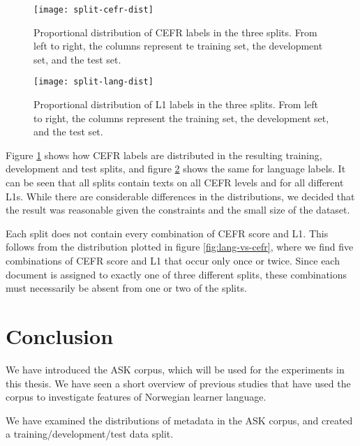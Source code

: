 \begin{figure}
  \centering
  \texttt{[image: split-cefr-dist]}
  \caption[Proportional distribution of CEFR labels in the three splits.]{
    Proportional distribution of CEFR labels in the three splits. From left
    to right, the columns represent te training set, the development set, and
    the test set.
  }
  \label{fig:split-cefr-dist}
\end{figure}

\begin{figure}
  \centering
  \texttt{[image: split-lang-dist]}
  \caption[Proportional distribution of L1 labels in the three splits.]{
    Proportional distribution of \ac{L1} labels in the three splits. From
    left to right, the columns represent the training set, the development
    set, and the test set.
  }
  \label{fig:split-lang-dist}
\end{figure}

Figure \ref{fig:split-cefr-dist} shows how CEFR labels are distributed in the
resulting training, development and test splits, and figure
\ref{fig:split-lang-dist} shows the same for language labels. It can be seen
that all splits contain texts on all CEFR levels and for all different
\acp{L1}. While there are considerable differences in the distributions, we
decided that the result was reasonable given the constraints and the small
size of the dataset.

Each split does not contain every combination of CEFR score and \ac{L1}. This
follows from the distribution plotted in figure \ref{fig:lang-vs-cefr}, where
we find five combinations of CEFR score and \ac{L1} that occur only once or
twice. Since each document is assigned to exactly one of three different
splits, these combinations must necessarily be absent from one or two of the
splits.


\section{Conclusion}

We have introduced the ASK corpus, which will be used for the experiments in
this thesis. We have seen a short overview of previous studies that have used
the corpus to investigate features of Norwegian learner language.

We have examined the distributions of metadata in the ASK corpus, and created
a training/development/test data split.
